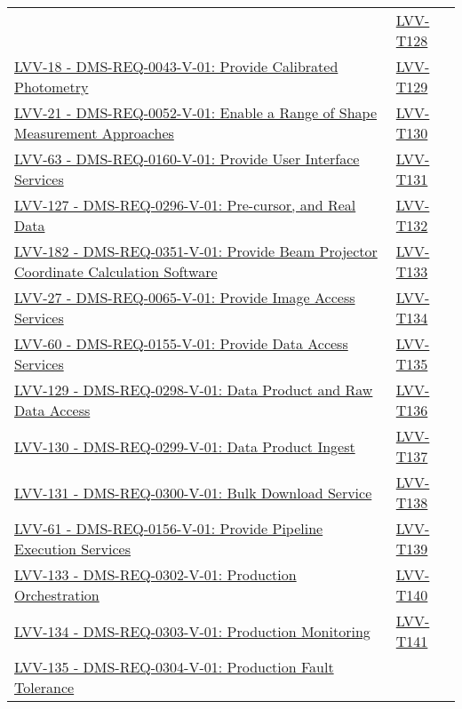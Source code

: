 {\begin{longtable}[]{p{13cm}p{3cm}}
& {
\hyperref[lvv-t128]{LVV-T128}
} \\
\href{https://jira.lsstcorp.org/browse/LVV-18}{LVV-18 - DMS-REQ-0043-V-01: Provide Calibrated Photometry}
& {
\hyperref[lvv-t129]{LVV-T129}
} \\
\href{https://jira.lsstcorp.org/browse/LVV-21}{LVV-21 - DMS-REQ-0052-V-01: Enable a Range of Shape Measurement Approaches}
& {
\hyperref[lvv-t130]{LVV-T130}
} \\
\href{https://jira.lsstcorp.org/browse/LVV-63}{LVV-63 - DMS-REQ-0160-V-01: Provide User Interface Services}
& {
\hyperref[lvv-t131]{LVV-T131}
} \\
\href{https://jira.lsstcorp.org/browse/LVV-127}{LVV-127 - DMS-REQ-0296-V-01: Pre-cursor, and Real Data}
& {
\hyperref[lvv-t132]{LVV-T132}
} \\
\href{https://jira.lsstcorp.org/browse/LVV-182}{LVV-182 - DMS-REQ-0351-V-01: Provide Beam Projector Coordinate Calculation Software}
& {
\hyperref[lvv-t133]{LVV-T133}
} \\
\href{https://jira.lsstcorp.org/browse/LVV-27}{LVV-27 - DMS-REQ-0065-V-01: Provide Image Access Services}
& {
\hyperref[lvv-t134]{LVV-T134}
} \\
\href{https://jira.lsstcorp.org/browse/LVV-60}{LVV-60 - DMS-REQ-0155-V-01: Provide Data Access Services}
& {
\hyperref[lvv-t135]{LVV-T135}
} \\
\href{https://jira.lsstcorp.org/browse/LVV-129}{LVV-129 - DMS-REQ-0298-V-01: Data Product and Raw Data Access}
& {
\hyperref[lvv-t136]{LVV-T136}
} \\
\href{https://jira.lsstcorp.org/browse/LVV-130}{LVV-130 - DMS-REQ-0299-V-01: Data Product Ingest}
& {
\hyperref[lvv-t137]{LVV-T137}
} \\
\href{https://jira.lsstcorp.org/browse/LVV-131}{LVV-131 - DMS-REQ-0300-V-01: Bulk Download Service}
& {
\hyperref[lvv-t138]{LVV-T138}
} \\
\href{https://jira.lsstcorp.org/browse/LVV-61}{LVV-61 - DMS-REQ-0156-V-01: Provide Pipeline Execution Services}
& {
\hyperref[lvv-t139]{LVV-T139}
} \\
\href{https://jira.lsstcorp.org/browse/LVV-133}{LVV-133 - DMS-REQ-0302-V-01: Production Orchestration}
& {
\hyperref[lvv-t140]{LVV-T140}
} \\
\href{https://jira.lsstcorp.org/browse/LVV-134}{LVV-134 - DMS-REQ-0303-V-01: Production Monitoring}
& {
\hyperref[lvv-t141]{LVV-T141}
} \\
\href{https://jira.lsstcorp.org/browse/LVV-135}{LVV-135 - DMS-REQ-0304-V-01: Production Fault Tolerance}

\end{longtable}}
